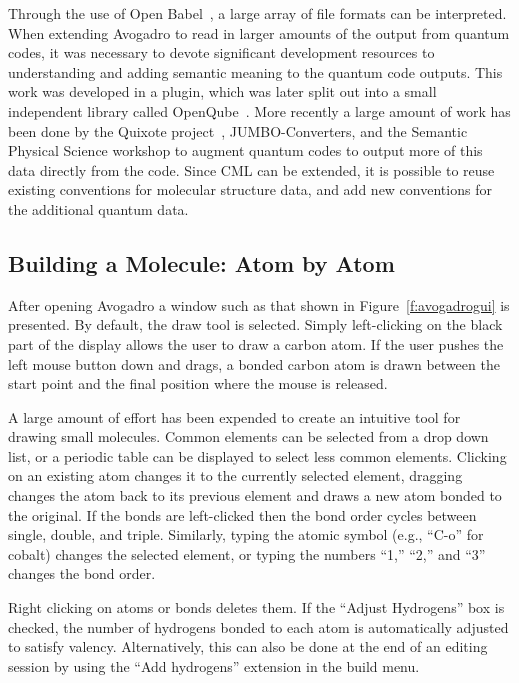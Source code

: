\documentclass[10pt]{bmc_article}
\newenvironment{bmcformat}{\begin{raggedright}
\baselineskip20pt\sloppy\setboolean{publ}{false}}{\end{raggedright}
\baselineskip20pt\sloppy}
\begin{document}
\begin{bmcformat}
Through the use of Open Babel~\cite{OpenBabel}, a large array of file
formats can be interpreted. When extending Avogadro to read in larger
amounts of the output from quantum codes, it was necessary to devote
significant development resources to understanding and adding semantic
meaning to the quantum code outputs. This work was developed in a plugin, which was later split out into a small independent
library called OpenQube~\cite{OpenQube,OpenQubeSource}. More recently a large amount of work has been done
by the Quixote project~\cite{Quixote}, JUMBO-Converters, and the Semantic
Physical Science workshop to augment quantum codes to output more of this data
directly from the code. Since CML can be extended, it is possible to reuse
existing conventions for molecular structure data, and add new
conventions for the additional quantum data.

\subsection{Building a Molecule: Atom by Atom}

After opening Avogadro a window such as that shown in Figure~\ref{f:avogadrogui}
is presented. By default, the draw tool is selected. Simply left-clicking on the
black part of the display
allows the user to draw a carbon atom. If the user pushes the left
mouse button down and drags, a bonded carbon atom is drawn
between the start point and the final position where the mouse is released.

A large amount of effort has been expended to create an intuitive tool for
drawing small molecules. Common elements can be selected from a drop down list,
or a periodic table can be displayed to select less common elements. Clicking on
an existing atom changes it to the currently selected element,
dragging changes the atom back to its previous element and draws
a new atom bonded to the original. If the bonds are left-clicked then the bond
order cycles between single, double, and triple. Similarly, typing the
atomic symbol (e.g., ``C-o'' for cobalt) changes the selected element,
or typing the numbers ``1,'' ``2,'' and ``3'' changes the bond order.

Right clicking on atoms or bonds deletes them. If the ``Adjust Hydrogens'' box
is checked, the number of hydrogens bonded to each atom is automatically
adjusted to satisfy valency. Alternatively, this can also be done at the end of
an editing session by using the ``Add hydrogens'' extension in the build menu.


\end{bmcformat}
\end{document}
